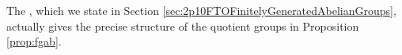 \documentclass[../algebraNotesMSRI-UP2016.tex]{subfiles}
\begin{document}
\begin{frame}[c]
The , which we state in Section \ref{sec:2p10FTOFinitelyGeneratedAbelianGroups}, actually gives the precise structure of the quotient groups in Proposition \ref{prop:fgab}.
\end{frame}

\begin{comment}
\answerKey
\begin{frame}{\subsecname}
\exeSol{exe:specialLinearGroup}
\end{frame}

\begin{frame}
\exeSol[(cf. Problem 74)]{exe:prob74}
\end{frame}

\begin{frame}
\exeSol[(cf. Problem 75)]{exe:fgAbGroup}
\end{frame}

\end{comment}
\end{document}

